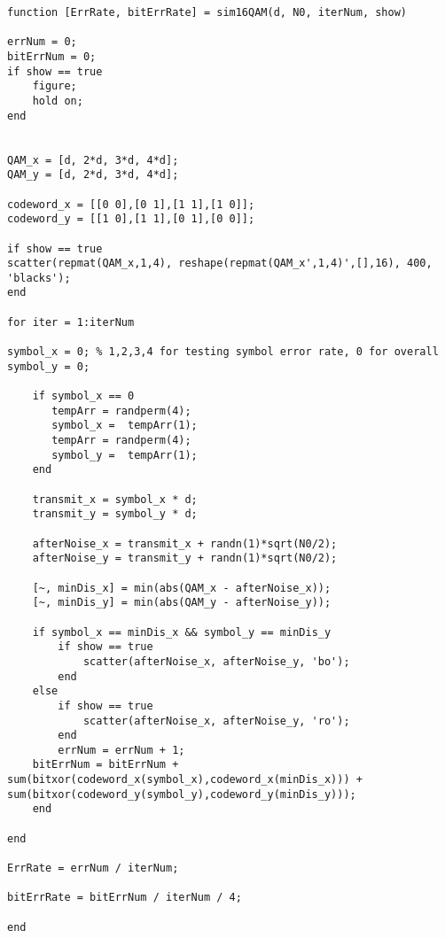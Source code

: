 \documentclass [12pt] {article}
\begin{document}
\begin{lstlisting}
function [ErrRate, bitErrRate] = sim16QAM(d, N0, iterNum, show)

errNum = 0;
bitErrNum = 0;
if show == true
    figure;
    hold on;
end
 

QAM_x = [d, 2*d, 3*d, 4*d];
QAM_y = [d, 2*d, 3*d, 4*d];

codeword_x = [[0 0],[0 1],[1 1],[1 0]];
codeword_y = [[1 0],[1 1],[0 1],[0 0]];

if show == true
scatter(repmat(QAM_x,1,4), reshape(repmat(QAM_x',1,4)',[],16), 400, 'blacks');
end

for iter = 1:iterNum

symbol_x = 0; % 1,2,3,4 for testing symbol error rate, 0 for overall
symbol_y = 0;

    if symbol_x == 0 
       tempArr = randperm(4);
       symbol_x =  tempArr(1);
       tempArr = randperm(4);
       symbol_y =  tempArr(1);
    end

    transmit_x = symbol_x * d;
    transmit_y = symbol_y * d;

    afterNoise_x = transmit_x + randn(1)*sqrt(N0/2);
    afterNoise_y = transmit_y + randn(1)*sqrt(N0/2);

    [~, minDis_x] = min(abs(QAM_x - afterNoise_x));
    [~, minDis_y] = min(abs(QAM_y - afterNoise_y));

    if symbol_x == minDis_x && symbol_y == minDis_y
        if show == true
            scatter(afterNoise_x, afterNoise_y, 'bo');
        end
    else
        if show == true
            scatter(afterNoise_x, afterNoise_y, 'ro'); 
        end
        errNum = errNum + 1;
	bitErrNum = bitErrNum + sum(bitxor(codeword_x(symbol_x),codeword_x(minDis_x))) + sum(bitxor(codeword_y(symbol_y),codeword_y(minDis_y)));
    end

end

ErrRate = errNum / iterNum;

bitErrRate = bitErrNum / iterNum / 4;

end
\end{lstlisting}
\end{document}
